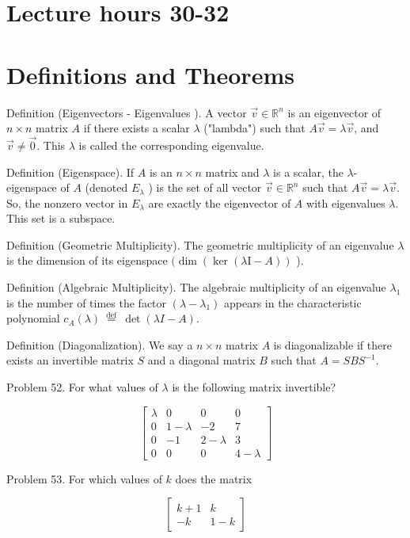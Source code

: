 \documentclass[10pt]{article}
\begin{document}
\section*{Lecture hours 30-32}
\section*{Definitions and Theorems}
Definition (Eigenvectors - Eigenvalues ). A vector $\vec{v} \in \mathbb{R}^{n}$ is an eigenvector of $n \times n$ matrix $A$ if there exists a scalar $\lambda$ ("lambda") such that $A \vec{v}=\lambda \vec{v}$, and $\vec{v} \neq \overrightarrow{0}$. This $\lambda$ is called the corresponding eigenvalue.

Definition (Eigenspace). If $A$ is an $n \times n$ matrix and $\lambda$ is a scalar, the $\lambda$-eigenspace of $A$ (denoted $E_{\lambda}$ ) is the set of all vector $\vec{v} \in \mathbb{R}^{n}$ such that $A \vec{v}=\lambda \vec{v}$. So, the nonzero vector in $E_{\lambda}$ are exactly the eigenvector of $A$ with eigenvalues $\lambda$. This set is a subspace.

Definition (Geometric Multiplicity). The geometric multiplicity of an eigenvalue $\lambda$ is the dimension of its eigenspace $(\operatorname{dim}(\operatorname{ker}(\lambda \mathrm{I}-A))$ ).

Definition (Algebraic Multiplicity). The algebraic multiplicity of an eigenvalue $\lambda_{1}$ is the number of times the factor $\left(\lambda-\lambda_{1}\right)$ appears in the characteristic polynomial $c_{A}(\lambda) \stackrel{\text { def }}{=} \operatorname{det}(\lambda I-A)$.

Definition (Diagonalization). We say a $n \times n$ matrix $A$ is diagonalizable if there exists an invertible matrix $S$ and a diagonal matrix $B$ such that $A=S B S^{-1}$.

Problem 52. For what values of $\lambda$ is the following matrix invertible?

$$
\left[\begin{array}{cccc}
\lambda & 0 & 0 & 0 \\
0 & 1-\lambda & -2 & 7 \\
0 & -1 & 2-\lambda & 3 \\
0 & 0 & 0 & 4-\lambda
\end{array}\right]
$$

Problem 53. For which values of $k$ does the matrix

$$
\left[\begin{array}{cc}
k+1 & k \\
-k & 1-k
\end{array}\right]
$$
\end{document}
